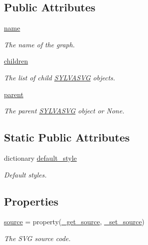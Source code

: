 \subsection*{Public Attributes}
\begin{DoxyCompactItemize}
\item 
\hyperlink{classsylva_1_1base_1_1sylva__base_1_1_s_y_l_v_a_s_v_g_a645228e918333f1037984d6169079449}{name}
\begin{DoxyCompactList}\small\item\em The name of the graph. \end{DoxyCompactList}\item 
\hyperlink{classsylva_1_1base_1_1sylva__base_1_1_s_y_l_v_a_s_v_g_a29eb878cbd3a0f1bae165da83d1447d4}{children}
\begin{DoxyCompactList}\small\item\em The list of child \hyperlink{classsylva_1_1base_1_1sylva__base_1_1_s_y_l_v_a_s_v_g}{S\+Y\+L\+V\+A\+S\+VG} objects. \end{DoxyCompactList}\item 
\hyperlink{classsylva_1_1base_1_1sylva__base_1_1_s_y_l_v_a_s_v_g_af54d51249c7dbb6841eb5f9dae5da94e}{parent}
\begin{DoxyCompactList}\small\item\em The parent \hyperlink{classsylva_1_1base_1_1sylva__base_1_1_s_y_l_v_a_s_v_g}{S\+Y\+L\+V\+A\+S\+VG} object or None. \end{DoxyCompactList}\end{DoxyCompactItemize}
\subsection*{Static Public Attributes}
\begin{DoxyCompactItemize}
\item 
dictionary \hyperlink{classsylva_1_1base_1_1sylva__base_1_1_s_y_l_v_a_s_v_g_ab3adb0b4627d8e6984b8bc5e4e2a4ce6}{default\+\_\+style}
\begin{DoxyCompactList}\small\item\em Default styles. \end{DoxyCompactList}\end{DoxyCompactItemize}
\subsection*{Properties}
\begin{DoxyCompactItemize}
\item 
\hyperlink{classsylva_1_1base_1_1sylva__base_1_1_s_y_l_v_a_s_v_g_aec2c2d79509fc5b5285ed6dad631a11e}{source} = property(\hyperlink{classsylva_1_1base_1_1sylva__base_1_1_s_y_l_v_a_s_v_g_ab5193e954ce5acbbf148e9874c0637e5}{\+\_\+get\+\_\+source}, \hyperlink{classsylva_1_1base_1_1sylva__base_1_1_s_y_l_v_a_s_v_g_af0aa37478ec3ba1167ae2cc18cdd12b8}{\+\_\+set\+\_\+source})
\begin{DoxyCompactList}\small\item\em The S\+VG source code. \end{DoxyCompactList}\end{DoxyCompactItemize}
